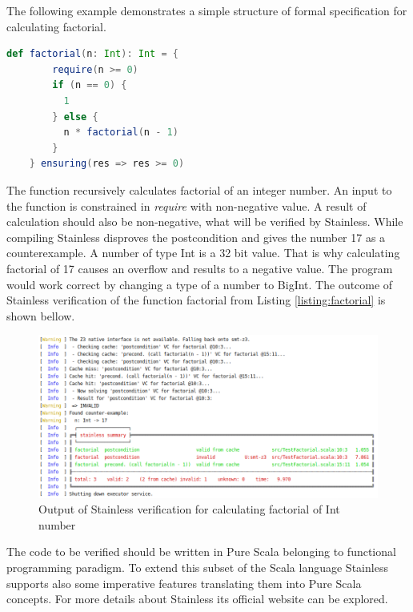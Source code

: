 The following example demonstrates a simple structure of formal specification for calculating factorial.

\begin{lstlisting}[caption=Example of verifying the function calculating factorial of an integer number, label=listing:factorial, captionpos=b, language=Scala]
    def factorial(n: Int): Int = {
        require(n >= 0)
        if (n == 0) {
          1
        } else {
          n * factorial(n - 1)
        }
    } ensuring(res => res >= 0)
\end{lstlisting}

The function recursively calculates factorial of an integer number. An input to the function is constrained in \textit{require} with non-negative value. A result of calculation should also be non-negative, what will be verified by Stainless.
While compiling Stainless disproves the postcondition and gives the number 17 as a counterexample. A number of type Int is a 32 bit value. That is why calculating factorial of 17 causes an overflow and results to a negative value. The program would work correct by changing a type of a number to BigInt.
The outcome of Stainless verification of the function factorial from Listing \ref{listing:factorial} is shown bellow.

\begin{figure}[H]
	\centering
		\includegraphics[scale=0.5]{images/output1.png}
	\caption{Output of Stainless verification for calculating factorial of Int number}
	\label{fig:output1}
\end{figure}


The code to be verified should be written in Pure Scala belonging to functional programming paradigm. To extend this subset of the Scala language Stainless supports also some imperative features translating them into Pure Scala concepts.
For more details about Stainless its official website can be explored. \cite{Stainless}

